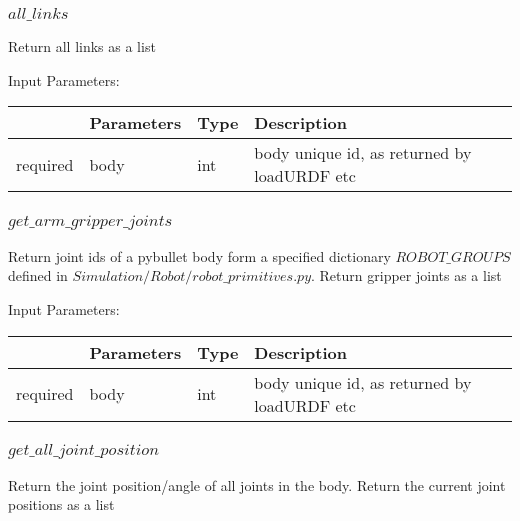 \documentclass[
	ngerman,
	accentcolor=9c,%
	type=intern,
	marginpar=false
	]{tudapub}
\begin{document}
\subsubsection{$all\_links$}
\noindent Return all links as a list


\vspace{0.5cm}
\noindent Input Parameters:
\vspace{0.5cm}

\begin{tabular}{|p{}|p{}|p{}| p{}|}
\hline
 & \textbf{Parameters} & \textbf{Type} & \textbf{Description} \\
\hline
required & body & int & body unique id, as returned by loadURDF etc\\
\hline
\end{tabular}
\vspace{0.5cm}




\subsubsection{$get\_arm\_gripper\_joints$}
\noindent Return joint ids of a pybullet body form a specified dictionary $ROBOT\_GROUPS$ defined in $Simulation/Robot/robot\_primitives.py$. Return gripper joints as a list



\vspace{0.5cm}
\noindent Input Parameters:
\vspace{0.5cm}

\begin{tabular}{|p{}|p{}|p{}| p{}|}
\hline
 & \textbf{Parameters} & \textbf{Type} & \textbf{Description} \\
\hline
required & body & int & body unique id, as returned by loadURDF etc\\
\hline
\end{tabular}
\vspace{0.5cm}





\subsubsection{$get\_all\_joint\_position$}
\noindent Return the joint position/angle of all joints in the body. Return the current joint positions as a list
\end{document}
